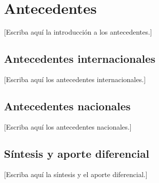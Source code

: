 \section{Antecedentes}

[Escriba aquí la introducción a los antecedentes.]

\subsection{Antecedentes internacionales}
[Escriba aquí los antecedentes internacionales.]

\subsection{Antecedentes nacionales}
[Escriba aquí los antecedentes nacionales.]

\subsection{Síntesis y aporte diferencial}
[Escriba aquí la síntesis y el aporte diferencial.]
